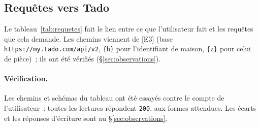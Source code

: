 \subsection{Requêtes vers Tado}
\label{sec:requetes}

Le tableau~\ref{tab:requetes} fait le lien entre ce que l'utilisateur fait et les requêtes que cela demande. Les
chemins viennent de [E3] (base \texttt{https://my.tado.com/api/v2}, \texttt{\{h\}} pour l'identifiant de maison,
\texttt{\{z\}} pour celui de pièce)~; ils ont été vérifiés (§\ref{sec:observations}).

\paragraph{Vérification.} Les chemins et schémas du tableau ont été essayés contre le compte de l'utilisateur~: toutes les lectures répondent \texttt{200}, aux formes attendues. Les écarts et les réponses d'écriture sont au §\ref{sec:observations}.

